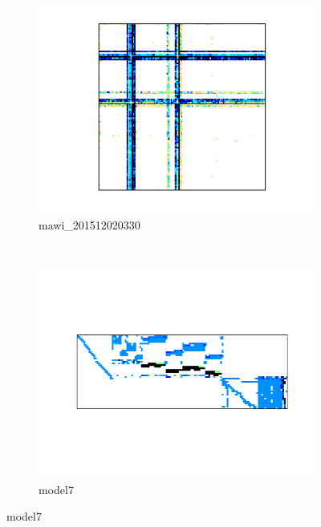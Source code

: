 \documentclass[conference]{IEEEtran}
\begin{document}
\begin{figure}[h!]
	\begin{subfigure}{0.40\linewidth}
		\centering
		\includegraphics[width=\linewidth]{model_images/mawi_201512020330}
		\caption{mawi\_201512020330}
		\label{dat:mawi_201512020330}
	\end{subfigure}
	~
	\begin{subfigure}{0.40\linewidth}
		\centering
		\includegraphics[width=\linewidth]{model_images/model7}
		\caption{model7}
		\label{dat:model7}
	\end{subfigure}


\end{figure}
\end{document}
